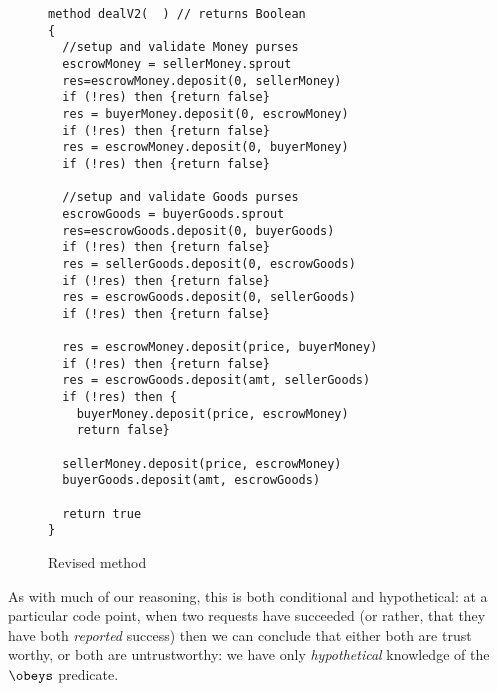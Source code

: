 \begin{figure}
\begin{lstlisting}
method dealV2(  ) // returns Boolean
{
  //setup and validate Money purses
  escrowMoney = sellerMoney.sprout
  res=escrowMoney.deposit(0, sellerMoney)
  if (!res) then {return false}
  res = buyerMoney.deposit(0, escrowMoney)
  if (!res) then {return false}
  res = escrowMoney.deposit(0, buyerMoney)
  if (!res) then {return false}

  //setup and validate Goods purses
  escrowGoods = buyerGoods.sprout
  res=escrowGoods.deposit(0, buyerGoods)
  if (!res) then {return false}
  res = sellerGoods.deposit(0, escrowGoods)
  if (!res) then {return false}
  res = escrowGoods.deposit(0, sellerGoods)
  if (!res) then {return false}

  res = escrowMoney.deposit(price, buyerMoney)
  if (!res) then {return false}
  res = escrowGoods.deposit(amt, sellerGoods)
  if (!res) then {
    buyerMoney.deposit(price, escrowMoney)
    return false}

  sellerMoney.deposit(price, escrowMoney)
  buyerGoods.deposit(amt, escrowGoods)

  return true
}
\end{lstlisting}
\caption{Revised  method}
\label{fig:DealV2}
\end{figure}
 

As with much of our reasoning, this is both conditional and
hypothetical: at a particular code point, when two 
requests have succeeded (or rather, that they have both
\textit{reported} success) then we can conclude that either both are
trust worthy, or both are untrustworthy: we have only {\em hypothetical}
knowledge of the $\obeys$ predicate.




